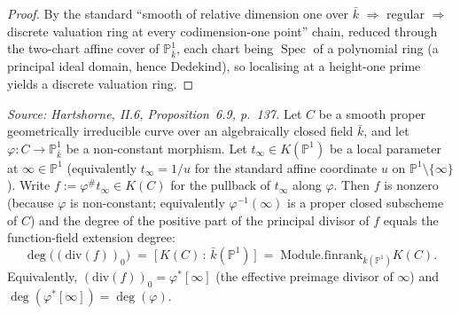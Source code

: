 \begin{proof}
  By the standard ``smooth of relative dimension one over \(\bar k\)
  \(\Rightarrow\) regular \(\Rightarrow\) discrete valuation ring at every
  codimension-one point'' chain, reduced through the two-chart affine cover of
  \(\mathbb P^1_{\bar k}\), each chart being \(\operatorname{Spec}\) of a
  polynomial ring (a principal ideal domain, hence Dedekind), so localising at
  a height-one prime yields a discrete valuation ring.
\end{proof}
\begin{lemma}

  \label{lem:degree_positivePart_principal_eq_finrank}
  \textit{Source: Hartshorne, II.6, Proposition~6.9, p.~137.}
  Let \(C\) be a smooth proper geometrically irreducible curve over an
  algebraically closed field \(\bar k\), and let
  \(\varphi \colon C \to \mathbb P^1_{\bar k}\) be a non-constant morphism.
  Let \(t_\infty \in K(\mathbb P^1)\) be a local parameter at \(\infty \in \mathbb P^1\)
  (equivalently \(t_\infty = 1/u\) for the standard affine coordinate \(u\) on
  \(\mathbb P^1 \setminus \{\infty\}\)). Write \(f := \varphi^{\#} t_\infty
  \in K(C)\) for the pullback of \(t_\infty\) along \(\varphi\). Then \(f\) is
  nonzero (because \(\varphi\) is non-constant; equivalently \(\varphi^{-1}(\infty)\)
  is a proper closed subscheme of \(C\)) and the degree of the positive
  part of the principal divisor of \(f\) equals the function-field
  extension degree:
  \[
    \deg\bigl((\mathrm{div}(f))_0\bigr)
    \;=\; \bigl[\,K(C) \,:\, \bar k(\mathbb P^1)\,\bigr]
    \;=\; \mathrm{Module.finrank}_{\bar k(\mathbb P^1)} K(C).
  \]
  Equivalently, \((\mathrm{div}(f))_0 = \varphi^{*}[\infty]\) (the effective
  preimage divisor of \(\infty\)) and \(\deg(\varphi^{*}[\infty]) = \deg(\varphi)\).
\end{lemma}
